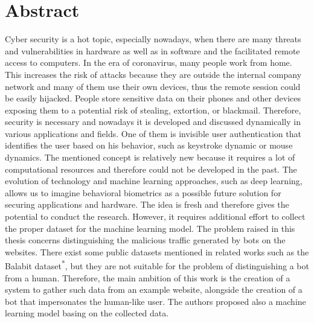 \section{Abstract}\label{sec:abstract}
Cyber security is a hot topic, especially nowadays, when there are many threats and vulnerabilities in hardware as well as in software and the facilitated remote access to computers.
In the era of coronavirus, many people work from home.
This increases the risk of attacks because they are outside the internal company network and many of them use their own devices, thus the remote session could be easily hijacked.
People store sensitive data on their phones and other devices exposing them to a potential risk of stealing, extortion, or blackmail.
Therefore, security is necessary and nowadays it is developed and discussed dynamically in various applications and fields.
One of them is invisible user authentication that identifies the user based on his behavior, such as keystroke dynamic or mouse dynamics.
The mentioned concept is relatively new because it requires a lot of computational resources and therefore could not be developed in the past.
The evolution of technology and machine learning approaches, such as deep learning, allows us to imagine behavioral biometrics as a possible future solution for securing applications and hardware.
The idea is fresh and therefore gives the potential to conduct the research.
However, it requires additional effort to collect the proper dataset for the machine learning model.
The problem raised in this thesis concerns distinguishing the malicious traffic generated by bots on the websites.
There exist some public datasets mentioned in related works such as the Balabit dataset\textsuperscript{*}, but they are not suitable for the problem of distinguishing a bot from a human.
Therefore, the main ambition of this work is the creation of a system to gather such data from an example website, alongside the creation of a bot that impersonates the human-like user.
The authors proposed also a machine learning model basing on the collected data.

